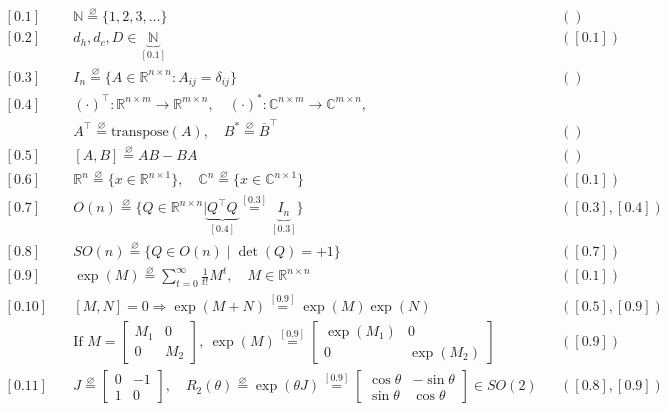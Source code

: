 \documentclass[11pt]{article}
\begin{document}
\begin{align}
\boxed{[0.1]}\quad & \mathbb{N} \overset{\varnothing}{=} \{1,2,3,\dots\} &&({})\\
\boxed{[0.2]}\quad & d_h,d_c,D \in \underbrace{\mathbb{N}}_{[0.1]} &&([0.1])\\
\boxed{[0.3]}\quad & I_n \overset{\varnothing}{=} \{A \in \mathbb{R}^{n\times n} : A_{ij} = \delta_{ij}\} &&({})\\
\boxed{[0.4]}\quad & (\cdot)^\top : \mathbb{R}^{n\times m} \to \mathbb{R}^{m\times n},\quad (\cdot)^* : \mathbb{C}^{n\times m} \to \mathbb{C}^{m\times n},\\
& A^\top \overset{\varnothing}{=} \text{transpose}(A),\quad B^* \overset{\varnothing}{=} \overline{B}^\top &&({})\\
\boxed{[0.5]}\quad & [A,B] \overset{\varnothing}{=} AB-BA &&({})\\
\boxed{[0.6]}\quad & \mathbb{R}^n \overset{\varnothing}{=} \{ x \in \mathbb{R}^{n\times 1}\},\quad \mathbb{C}^n \overset{\varnothing}{=} \{ x \in \mathbb{C}^{n\times 1}\} &&([0.1])\\
\boxed{[0.7]}\quad & O(n) \overset{\varnothing}{=} \Big\{Q \in \mathbb{R}^{n\times n} \Big| \underbrace{Q^\top Q}_{[0.4]} \overset{[0.3]}{=} \underbrace{I_n}_{[0.3]}\Big\} &&([0.3],[0.4])\\
\boxed{[0.8]}\quad & SO(n) \overset{\varnothing}{=} \Big\{Q \in O(n) \mid \det(Q)=+1\Big\} &&([0.7])\\
\boxed{[0.9]}\quad & \exp(M) \overset{\varnothing}{=} \sum_{t=0}^{\infty} \frac{1}{t!} M^t,\quad M \in \mathbb{R}^{n\times n} &&([0.1])\\
\boxed{[0.10]}\quad & [M,N]=0 \Longrightarrow \exp(M+N) \overset{[0.9]}{=} \exp(M)\exp(N) &&([0.5],[0.9])\\
& \text{If } M = \begin{bmatrix}M_1 & 0\\0 & M_2\end{bmatrix},\ \exp(M) \overset{[0.9]}{=} \begin{bmatrix}\exp(M_1)&0\\0&\exp(M_2)\end{bmatrix} &&([0.9])\\
\boxed{[0.11]}\quad & J \overset{\varnothing}{=} \begin{bmatrix}0&-1\\1&0\end{bmatrix},\quad R_2(\theta) \overset{\varnothing}{=} \exp(\theta J) \overset{[0.9]}{=} \begin{bmatrix}\cos\theta & -\sin\theta\\ \sin\theta & \cos\theta\end{bmatrix} \in SO(2) &&([0.8],[0.9])\\

\end{align}
\end{document}

